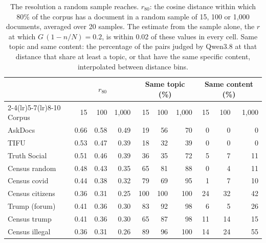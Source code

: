 \begin{table}[t]
\centering
\small
\begin{tabular}{lrrrrrrrrr}
\toprule
 & \multicolumn{3}{c}{$r_{80}$} & \multicolumn{3}{c}{Same topic (\%)} & \multicolumn{3}{c}{Same content (\%)} \\
\cmidrule(lr){2-4}\cmidrule(lr){5-7}\cmidrule(lr){8-10}
Corpus & 15 & 100 & 1{,}000 & 15 & 100 & 1{,}000 & 15 & 100 & 1{,}000 \\
\midrule
AskDocs & 0.66 & 0.58 & 0.49 & 19 & 56 & 70 & 0 & 0 & 0 \\
TIFU & 0.53 & 0.47 & 0.39 & 18 & 32 & 39 & 0 & 0 & 0 \\
Truth Social & 0.51 & 0.46 & 0.39 & 36 & 35 & 72 & 5 & 7 & 11 \\
Census random & 0.48 & 0.43 & 0.35 & 65 & 81 & 88 & 0 & 4 & 11 \\
Census covid & 0.44 & 0.38 & 0.32 & 79 & 69 & 95 & 1 & 7 & 10 \\
Census citizens & 0.36 & 0.31 & 0.25 & 100 & 100 & 100 & 24 & 32 & 42 \\
Trump (forum) & 0.41 & 0.36 & 0.30 & 83 & 92 & 98 & 6 & 5 & 26 \\
Census trump & 0.41 & 0.36 & 0.30 & 65 & 87 & 98 & 11 & 14 & 15 \\
Census illegal & 0.36 & 0.31 & 0.26 & 89 & 96 & 100 & 14 & 24 & 55 \\
\bottomrule
\end{tabular}
\caption{The resolution a random sample reaches. $r_{80}$: the cosine distance within which 80\% of the corpus has a document in a random sample of 15, 100 or 1{,}000 documents, averaged over 20 samples. The estimate from the sample alone, the $r$ at which $G\,(1 - n/N) = 0.2$, is within 0.02 of these values in every cell. Same topic and same content: the percentage of the pairs judged by Qwen3.8 at that distance that share at least a topic, or that have the same specific content, interpolated between distance bins.}
\label{tab:resolution}
\end{table}
